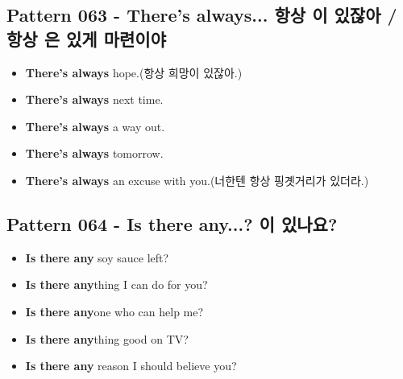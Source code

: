 \documentclass[11pt]{oblivoir}
\begin{document}
\subsection{Pattern 063 - There's always... 항상 \texttildelow 이 있잖아 / 항상 \texttildelow 은 있게 마련이야}
\begin{itemize}
  \item \textbf{There's always} hope.(항상 희망이 있잖아.)
  \item \textbf{There's always} next time.
  \item \textbf{There's always} a way out.
  \item \textbf{There's always} tomorrow.
  \item \textbf{There's always} an excuse with you.(너한텐 항상 핑곗거리가 있더라.)
\end{itemize}

\subsection{Pattern 064 - Is there any...? \texttildelow 이 있나요?}
\begin{itemize}
  \item \textbf{Is there any} soy sauce left?
  \item \textbf{Is there any}thing I can do for you?
  \item \textbf{Is there any}one who can help me?
  \item \textbf{Is there any}thing good on TV?
  \item \textbf{Is there any} reason I should believe you?
\end{itemize}
\end{document}
